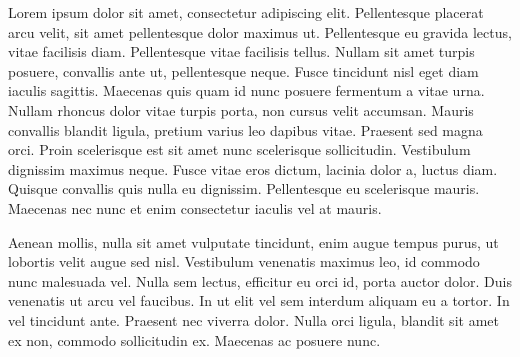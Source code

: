 Lorem ipsum dolor sit amet, consectetur adipiscing elit. Pellentesque placerat arcu velit, sit amet pellentesque dolor maximus ut. Pellentesque eu gravida lectus, vitae facilisis diam. Pellentesque vitae facilisis tellus. Nullam sit amet turpis posuere, convallis ante ut, pellentesque neque. Fusce tincidunt nisl eget diam iaculis sagittis. Maecenas quis quam id nunc posuere fermentum a vitae urna. Nullam rhoncus dolor vitae turpis porta, non cursus velit accumsan. Mauris convallis blandit ligula, pretium varius leo dapibus vitae. Praesent sed magna orci. Proin scelerisque est sit amet nunc scelerisque sollicitudin. Vestibulum dignissim maximus neque. Fusce vitae eros dictum, lacinia dolor a, luctus diam. Quisque convallis quis nulla eu dignissim. Pellentesque eu scelerisque mauris. Maecenas nec nunc et enim consectetur iaculis vel at mauris.

Aenean mollis, nulla sit amet vulputate tincidunt, enim augue tempus purus, ut lobortis velit augue sed nisl. Vestibulum venenatis maximus leo, id commodo nunc malesuada vel. Nulla sem lectus, efficitur eu orci id, porta auctor dolor. Duis venenatis ut arcu vel faucibus. In ut elit vel sem interdum aliquam eu a tortor. In vel tincidunt ante. Praesent nec viverra dolor. Nulla orci ligula, blandit sit amet ex non, commodo sollicitudin ex. Maecenas ac posuere nunc.